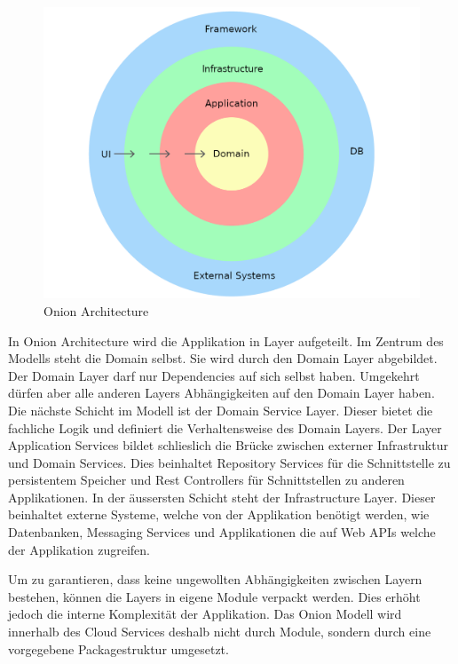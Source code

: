 \begin{figure}[h]
    \centering
    \begin{minipage}[b]{0.5\textwidth}
        \includegraphics[width=\textwidth]{graphics/clean-architecture}
        \caption{Onion Architecture}
    \end{minipage}
\end{figure}

In Onion Architecture wird die Applikation in Layer aufgeteilt.\cite{medium-onion}
Im Zentrum des Modells steht die Domain selbst.
Sie wird durch den Domain Layer abgebildet.
Der Domain Layer darf nur Dependencies auf sich selbst haben.
Umgekehrt dürfen aber alle anderen Layers Abhängigkeiten auf den Domain Layer haben.
Die nächste Schicht im Modell ist der Domain Service Layer.
Dieser bietet die fachliche Logik und definiert die Verhaltensweise des Domain Layers.
Der Layer Application Services bildet schlieslich die Brücke zwischen externer Infrastruktur und Domain Services.
Dies beinhaltet Repository Services für die Schnittstelle zu persistentem Speicher und Rest Controllers für Schnittstellen zu anderen Applikationen.
In der äussersten Schicht steht der Infrastructure Layer.
Dieser beinhaltet externe Systeme, welche von der Applikation benötigt werden, wie Datenbanken, Messaging Services und Applikationen die auf Web APIs welche der Applikation zugreifen.

Um zu garantieren, dass keine ungewollten Abhängigkeiten zwischen Layern bestehen, können die Layers in eigene Module verpackt werden.
Dies erhöht jedoch die interne Komplexität der Applikation.
Das Onion Modell wird innerhalb des Cloud Services deshalb nicht durch Module, sondern durch eine vorgegebene Packagestruktur umgesetzt.

